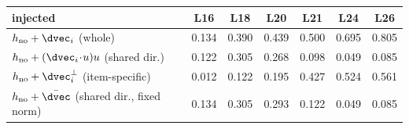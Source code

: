 \begin{tabular}{lcccccc}
\toprule
\rowcolor{TableHeader}
injected & L16 & L18 & L20 & L21 & L24 & L26 \\
\midrule
$h_{\text{no}} + \dvec_i$ (whole) & 0.134 & 0.390 & 0.439 & 0.500 & 0.695 & 0.805 \\
$h_{\text{no}} + (\dvec_i\!\cdot\!u)u$ (shared dir.) & 0.122 & 0.305 & 0.268 & 0.098 & 0.049 & 0.085 \\
$h_{\text{no}} + \dvec_i^{\perp}$ (item-specific) & 0.012 & 0.122 & 0.195 & 0.427 & 0.524 & 0.561 \\
$h_{\text{no}} + \bar{\dvec}$ (shared dir., fixed norm) & 0.134 & 0.305 & 0.293 & 0.122 & 0.049 & 0.085 \\
\bottomrule
\end{tabular}
